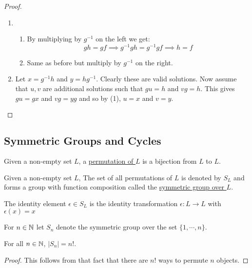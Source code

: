 \documentclass[11pt]{article}
\begin{document}
\begin{proof}\,
\begin{enumerate}
    \item\begin{enumerate}
        \item By multiplying by $g^{-1}$ on the left we get:
        \[gh=gf\implies g^{-1}gh=g^{-1}gf\implies h=f\]
        \item Same as before but multiply by $g^{-1}$ on the right.
    \end{enumerate}
    \item Let $x=g^{-1}h$ and $y=hg^{-1}$. Clearly these are valid solutions. Now assume that $u,v$ are additional solutions such that $gu=h$ and $vg=h$. This gives $gu=gx$ and $vg=yg$ and so by (1), $u=x$ and $v=y$. 
\end{enumerate}
\end{proof}

\subsection{Symmetric Groups and Cycles}

\begin{definition}[Permutations]
    Given a non-empty set $L$, a \ul{permutation of $L$} is a bijection from $L$ to $L$.
\end{definition}

\begin{definition}
     Given a non-empty set $L$, The set of all permutations of $L$ is denoted by $S_L$ and forms a group with function composition called the \ul{symmetric group over $L$}.
\end{definition}

\begin{note}
    The identity element $\epsilon\in S_L$ is the identity transformation $\epsilon:L\to L$ with $\epsilon(x)=x$
\end{note}

\begin{notation}
    For $n\in\mathbb{N}$ let $S_n$ denote the symmetric group over the set $\{1,\cdots,n\}$.
\end{notation}

\begin{proposition}
    For all $n\in\mathbb{N}$, $|S_n|=n!$.
\end{proposition}

\begin{proof}
    This follows from that fact that there are $n!$ ways to permute $n$ objects.
\end{proof}
\end{document}
